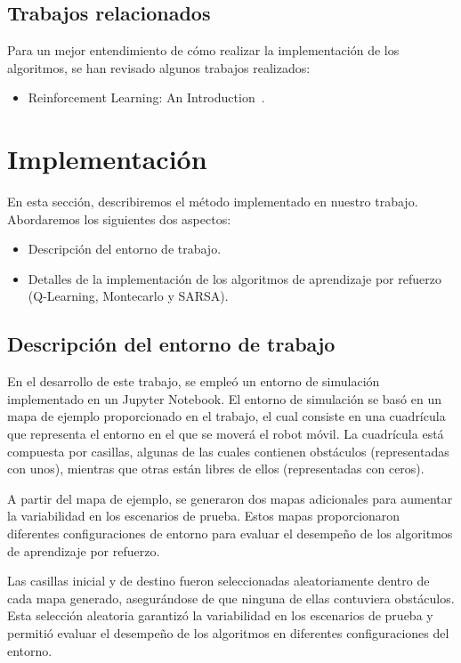 \documentclass[conference,a4paper]{IEEEtran}
\begin{document}
\subsection{Trabajos relacionados}
Para un mejor entendimiento de cómo realizar la implementación de los algoritmos, se han revisado algunos trabajos realizados:
\begin{itemize}
  \item Reinforcement Learning: An Introduction~\cite{b1}.
\end{itemize}

\section{Implementación}

En esta sección, describiremos el método implementado en nuestro trabajo. Abordaremos los siguientes dos aspectos:

\begin{itemize}
  \item Descripción del entorno de trabajo.
  \item Detalles de la implementación de los algoritmos de aprendizaje por refuerzo (Q-Learning, Montecarlo y SARSA).
\end{itemize}

\subsection{Descripción del entorno de trabajo}

En el desarrollo de este trabajo, se empleó un entorno de simulación implementado en un Jupyter Notebook. El entorno de simulación se basó en un mapa de ejemplo proporcionado en el trabajo, el cual consiste en una cuadrícula que representa el entorno en el que se moverá el robot móvil. La cuadrícula está compuesta por casillas, algunas de las cuales contienen obstáculos (representadas con unos), mientras que otras están libres de ellos (representadas con ceros).\newline

A partir del mapa de ejemplo, se generaron dos mapas adicionales para aumentar la variabilidad en los escenarios de prueba. Estos mapas proporcionaron diferentes configuraciones de entorno para evaluar el desempeño de los algoritmos de aprendizaje por refuerzo.\newline

Las casillas inicial y de destino fueron seleccionadas aleatoriamente dentro de cada mapa generado, asegurándose de que ninguna de ellas contuviera obstáculos. Esta selección aleatoria garantizó la variabilidad en los escenarios de prueba y permitió evaluar el desempeño de los algoritmos en diferentes configuraciones del entorno.\newline
\end{document}
